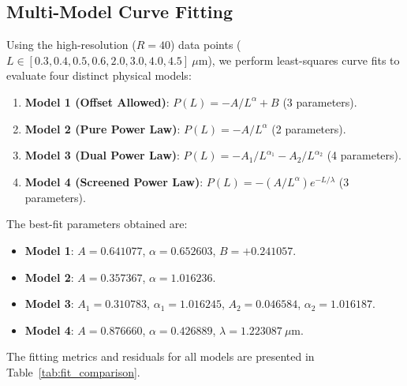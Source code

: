 \documentclass[12pt,letterpaper]{article}
\begin{document}
\subsection{Multi-Model Curve Fitting}
Using the high-resolution ($R=40$) data points ($L \in [0.3, 0.4, 0.5, 0.6, 2.0, 3.0, 4.0, 4.5]\ \mu\text{m}$), we perform least-squares curve fits to evaluate four distinct physical models:
\begin{enumerate}
    \item \textbf{Model 1 (Offset Allowed)}: $P(L) = -A/L^\alpha + B$ (3 parameters).
    \item \textbf{Model 2 (Pure Power Law)}: $P(L) = -A/L^\alpha$ (2 parameters).
    \item \textbf{Model 3 (Dual Power Law)}: $P(L) = -A_1/L^{\alpha_1} - A_2/L^{\alpha_2}$ (4 parameters).
    \item \textbf{Model 4 (Screened Power Law)}: $P(L) = -(A/L^\alpha) e^{-L/\lambda}$ (3 parameters).
\end{enumerate}

The best-fit parameters obtained are:
\begin{itemize}
    \item \textbf{Model 1}: $A = 0.641077$, $\alpha = 0.652603$, $B = +0.241057$.
    \item \textbf{Model 2}: $A = 0.357367$, $\alpha = 1.016236$.
    \item \textbf{Model 3}: $A_1 = 0.310783$, $\alpha_1 = 1.016245$, $A_2 = 0.046584$, $\alpha_2 = 1.016187$.
    \item \textbf{Model 4}: $A = 0.876660$, $\alpha = 0.426889$, $\lambda = 1.223087\ \mu\text{m}$.
\end{itemize}

The fitting metrics and residuals for all models are presented in Table~\ref{tab:fit_comparison}.
\end{document}
